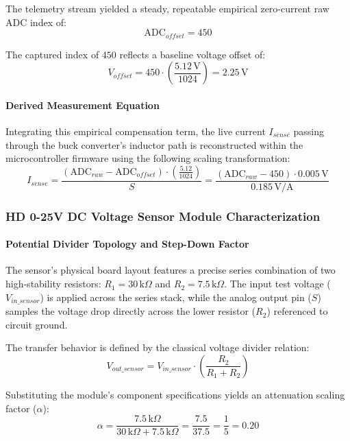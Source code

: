 The telemetry stream yielded a steady, repeatable empirical zero-current raw ADC index of:
\begin{equation}
\text{ADC}_{offset} = 450
\end{equation}

The captured index of $450$ reflects a baseline voltage offset of:
\begin{equation}
V_{offset} = 450 \cdot \left(\frac{5.12\,\text{V}}{1024}\right) = 2.25\,\text{V}
\end{equation}

\paragraph{Derived Measurement Equation}
Integrating this empirical compensation term, the live current $I_{sense}$ passing through the buck converter's inductor path is reconstructed within the microcontroller firmware using the following scaling transformation:
\begin{equation}
I_{sense} = \frac{\left(\text{ADC}_{raw} - \text{ADC}_{offset}\right) \cdot \left(\frac{5.12}{1024}\right)}{S} = \frac{\left(\text{ADC}_{raw} - 450\right) \cdot 0.005\,\text{V}}{0.185\,\text{V/A}}
\end{equation}

\subsubsection{HD 0-25V DC Voltage Sensor Module Characterization}
\paragraph{Potential Divider Topology and Step-Down Factor}
The sensor's physical board layout features a precise series combination of two high-stability resistors: $R_1 = 30\,\text{k}\Omega$ and $R_2 = 7.5\,\text{k}\Omega$. The input test voltage ($V_{in\_sensor}$) is applied across the series stack, while the analog output pin ($S$) samples the voltage drop directly across the lower resistor ($R_2$) referenced to circuit ground.

The transfer behavior is defined by the classical voltage divider relation:
\begin{equation}
V_{out\_sensor} = V_{in\_sensor} \cdot \left( \frac{R_2}{R_1 + R_2} \right)
\end{equation}

Substituting the module's component specifications yields an attenuation scaling factor ($\alpha$):
\begin{equation}
\alpha = \frac{7.5\,\text{k}\Omega}{30\,\text{k}\Omega + 7.5\,\text{k}\Omega} = \frac{7.5}{37.5} = \frac{1}{5} = 0.20
\end{equation}

